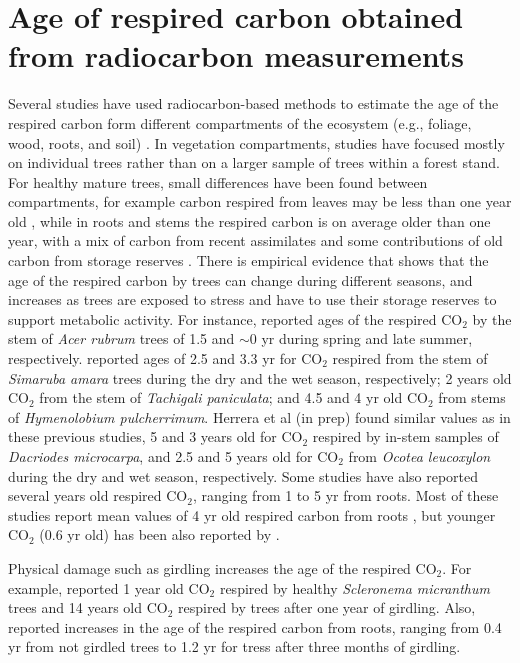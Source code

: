 \documentclass[bg, manuscript]{copernicus}
\begin{document}
\section{Age of respired carbon obtained from radiocarbon measurements}
Several studies have used radiocarbon-based methods to estimate the age of the respired carbon form different compartments of the ecosystem (e.g., foliage, wood, roots, and soil) \citep{carbone:2007, Carbone:200713, carbone:2013, muhr:2013, Muhr:2018, Trumbore:2015}. 
In vegetation compartments, studies have focused mostly on individual trees rather than on a larger sample of trees within a forest stand. For healthy mature trees, small differences have been found between compartments, for example carbon respired from leaves may be less than one year old \citep{carbone:2007}, while in roots and stems the respired carbon is on average older than one year, with a mix of carbon from recent assimilates and some contributions of old carbon from storage reserves \citep{Muhr:2018}. There is empirical evidence that shows that the age of the respired carbon by trees can change during different seasons, and increases as trees are exposed to stress and have to use their storage reserves to support metabolic activity.  For instance, \citet{carbone:2013} reported ages of the respired CO$_2$ by the stem of \textit{Acer rubrum} trees of 1.5 and  $\sim$0 yr during spring and late summer, respectively. \citet{muhr:2013} reported ages of 2.5 and 3.3 yr for CO$_2$ respired from the stem of \textit{Simaruba amara} trees during the dry and the wet season, respectively; 2 years old CO$_2$ from the stem of \textit{Tachigali paniculata}; and 4.5 and 4 yr old CO$_2$ from stems of \textit{Hymenolobium pulcherrimum}. Herrera et al (in prep) found similar values as in these previous studies, 5 and 3 years old for CO$_2$ respired by in-stem samples of \textit{Dacriodes microcarpa}, and 2.5 and 5 years old for CO$_2$ from \textit{Ocotea leucoxylon} during the dry  and wet season, respectively. Some studies have also reported several years old respired CO$_2$, ranging from 1 to 5 yr from roots. Most of these studies report mean values of 4 yr old respired carbon from roots \citep{CZIMCZIK:2006td, Schuur:2006tm, carbone:2007}, but younger CO$_2$ (0.6 yr old) has been also reported by \citet{Hilman:2021us}. 

Physical damage such as girdling increases the age of the respired CO$_2$. For example, \citet{Muhr:2018} reported 1 year old CO$_2$ respired by healthy \textit{Scleronema micranthum} trees and 14 years old CO$_2$ respired by trees after one year of girdling. Also, \citet{Hilman:2021us} reported increases in the age of the respired carbon from roots, ranging from 0.4 yr from not girdled trees to 1.2 yr for tress after three months of girdling.  
\end{document}
